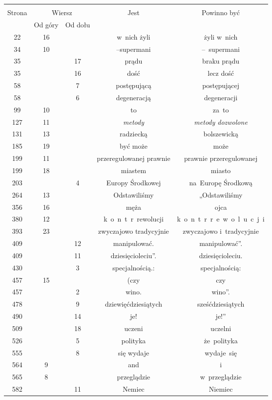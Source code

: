 \documentclass[a4paper,11pt]{article}
\begin{document}
\begin{center}

  \begin{tabular}{|c|c|c|c|c|}
    \hline
    & \multicolumn{2}{c|}{} & & \\
    Strona & \multicolumn{2}{c|}{Wiersz} & Jest
                              & Powinno być \\ \cline{2-3}
    & Od góry & Od dołu & & \\
    \hline
    22  & 16 & & w~nich żyli & żyli w~nich \\
    34  & 10 & & --supermani & --~supermani \\
    35  & & 17 & prądu & braku prądu \\
    35  & & 16 & dość & lecz dość \\
    58  & &  7 & postępującą & postępującej \\
    58  & &  6 & degeneracją & degeneracji \\
    99  & 10 & & to & za~to \\
    127 & 11 & & \emph{metody} & \emph{metody dozwolone} \\
    131 & 13 & & radziecką & bolszewicką \\
    185 & 19 & & być może & może \\
    199 & 11 & & przeregulowanej prawnie & prawnie przeregulowanej \\
    199 & 18 & & miastem & miasto \\
    203 & &  4 & Europy Środkowej & na~Europę Środkową \\
    264 & 13 & & Odstawiliśmy & „Odstawiliśmy \\
    356 & 16 & & męża & ojca \\
    380 & 12 & & k~o~n~t~r~rewolucji & k~o~n~t~r~r~e~w~o~l~u~c~j~i \\
    393 & 23 & & zwyczajowo tradycyjnie & zwyczajowo i~tradycyjnie \\
    409 & & 12 & manipulować. & manipulować''. \\
    409 & & 11 & dziesięcioleciu''. & dziesięcioleciu. \\
    430 & &  3 & specjalnością.: & specjalnością: \\
    457 & 15 & & (czy & czy \\
    457 & &  2 & wino. & wino''. \\
    478 & &  9 & dziewięćdziesiątych & sześćdziesiątych \\
    490 & & 14 & je! & je!'' \\
    509 & & 18 & uczeni & uczelni \\
    526 & &  5 & polityka & że~polityka \\
    555 & &  8 & się wydaje & wydaje~się \\
    564 &  9 & & and & i \\
    565 &  8 & & przeglądzie & w~przeglądzie \\
    582 & & 11 & Nemiec & Niemiec \\
    \hline
  \end{tabular}




\end{center}
\end{document}
